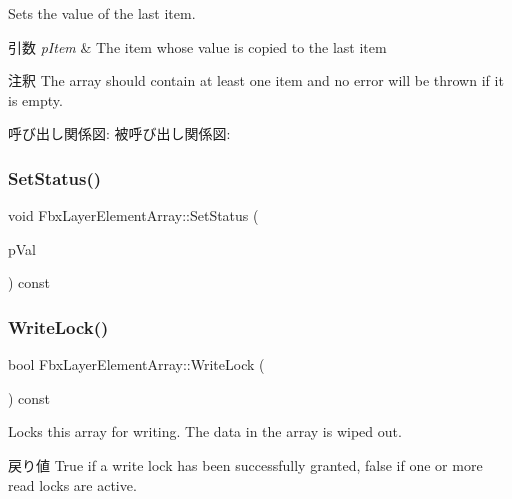 Sets the value of the last item. 
\begin{DoxyParams}{引数}
{\em p\+Item} & The item whose value is copied to the last item \\
\hline
\end{DoxyParams}
\begin{DoxyRemark}{注釈}
The array should contain at least one item and no error will be thrown if it is empty. 
\end{DoxyRemark}
呼び出し関係図\+:
被呼び出し関係図\+:
\mbox{\label{class_fbx_layer_element_array_ad61caca510c54feb2181fc57b61869d4}} 
\subsubsection{\texorpdfstring{Set\+Status()}{SetStatus()}}
{\footnotesize\ttfamily void Fbx\+Layer\+Element\+Array\+::\+Set\+Status (\begin{DoxyParamCaption}\item[{\hyperlink{class_lock_access_status_a3314dad01b38dd90f5393e108a07b3c1}{Lock\+Access\+Status\+::\+E\+Lock\+Access\+Status}}]{p\+Val }\end{DoxyParamCaption}) const\hspace{0.3cm}{\ttfamily [protected]}}

\mbox{\label{class_fbx_layer_element_array_a828b1e27e5025c726bdc15b983522e4e}} 
\subsubsection{\texorpdfstring{Write\+Lock()}{WriteLock()}}
{\footnotesize\ttfamily bool Fbx\+Layer\+Element\+Array\+::\+Write\+Lock (\begin{DoxyParamCaption}{ }\end{DoxyParamCaption}) const}

Locks this array for writing. The data in the array is wiped out. \begin{DoxyReturn}{戻り値}
{\ttfamily True} if a write lock has been successfully granted, {\ttfamily false} if one or more read locks are active. 
\end{DoxyReturn}
\mbox{\label{class_fbx_layer_element_array_a519b1b44abd526e00c6ee9e4f3a38e2d}} 
